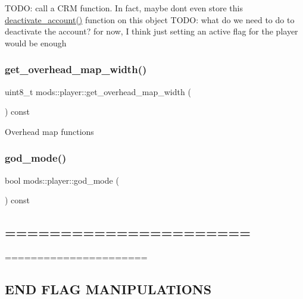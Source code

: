 T\+O\+DO\+: call a C\+RM function. In fact, maybe don\textquotesingle{}t even store this \hyperlink{classmods_1_1player_abbbcc9a9d532b3fbfcd16faeb72e8a35}{deactivate\+\_\+account()} function on this object T\+O\+DO\+: what do we need to do to deactivate the account? for now, I think just setting an active flag for the player would be enough\mbox{\label{classmods_1_1player_a05b78e56ec3b207c2ebd5396b4e3bd65}} 
\subsubsection{\texorpdfstring{get\+\_\+overhead\+\_\+map\+\_\+width()}{get\_overhead\_map\_width()}}
{\footnotesize\ttfamily uint8\+\_\+t mods\+::player\+::get\+\_\+overhead\+\_\+map\+\_\+width (\begin{DoxyParamCaption}{ }\end{DoxyParamCaption}) const\hspace{0.3cm}{\ttfamily [inline]}}

Overhead map functions \mbox{\label{classmods_1_1player_a2ce826104a9d3a2c853ee6d4e02fe689}} 
\subsubsection{\texorpdfstring{god\+\_\+mode()}{god\_mode()}}
{\footnotesize\ttfamily bool mods\+::player\+::god\+\_\+mode (\begin{DoxyParamCaption}{ }\end{DoxyParamCaption}) const}

\subsection*{====================== }

====================== \subsection*{E\+ND F\+L\+AG M\+A\+N\+I\+P\+U\+L\+A\+T\+I\+O\+NS }

